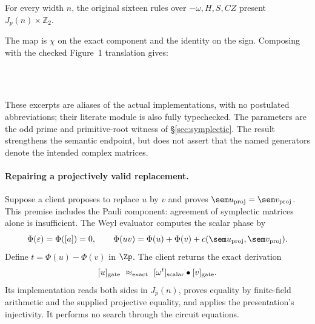 \begin{theorem}\label{thm:figure1}
For every width $n$, the original sixteen rules over $-\omega,H,S,CZ$
present $J_p(n)\times\mathbb Z_2$.
\end{theorem}
The map is $\chi$ on the exact component and the identity on the sign.
Composing with the checked Figure~1 translation gives:
\begingroup\renewcommand{\AgdaCodeStyle}{\footnotesize}
\begin{code}%
\>[0]\AgdaSpace{}%
\AgdaSymbol{:}\AgdaSpace{}%
\AgdaSpace{}%
\AgdaSpace{}%
\<%
\\
\>[0][@{}l@{\AgdaIndent{0}}]%
\>[2]\AgdaSymbol{(}\AgdaSpace{}%
\AgdaSymbol{)}\AgdaSpace{}%
\AgdaSpace{}%
\AgdaSymbol{(}\AgdaSpace{}%
\AgdaSymbol{)}\<%
\\
\>[0]\AgdaSpace{}%
\AgdaSymbol{=}\AgdaSpace{}%
\<%
\end{code}
\endgroup
These excerpts are aliases of the actual implementations, with no
postulated abbreviations; their literate module is also fully typechecked.
The parameters are the odd prime and primitive-root witness of
\S\ref{sec:symplectic}. The result strengthens the semantic endpoint,
but does not assert that the named generators denote the intended
complex matrices.

\paragraph{Repairing a projectively valid replacement.}
Suppose a client proposes to replace $u$ by $v$ and proves
$\sem u_{\rm proj}=\sem v_{\rm proj}$. This premise includes the Pauli
component: agreement of symplectic matrices alone is insufficient.
The Weyl evaluator computes the scalar phase by
\[
\Phi(\varepsilon)=\Phi([a])=0,\qquad
\Phi(uv)=\Phi(u)+\Phi(v)+c(\sem u_{\rm proj},\sem v_{\rm proj}).
\]
Define $t=\Phi(u)-\Phi(v)$ in $\Zp$. The client returns the exact
derivation
\[
 [u]_{\rm gate}\ \approx_{\rm exact}\
 [\omega^t]_{\rm scalar}\bullet[v]_{\rm gate}.
\]
Its implementation reads both sides in $J_p(n)$, proves equality by
finite-field arithmetic and the supplied projective equality, and
applies the presentation's injectivity. It performs no search through
the circuit equations.

